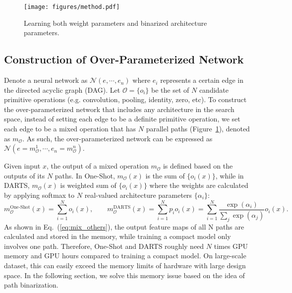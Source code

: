 \documentclass{article} \usepackage{iclr2019_conference,times}
\begin{document}
\begin{figure}[t]
    \vspace{-10pt}
	\centering
	\texttt{[image: figures/method.pdf]}
\caption{Learning both weight parameters and binarized architecture parameters.}
	\label{fig:method}
\end{figure}

\subsection{Construction of Over-Parameterized Network}\label{sec:over-parameterized}
Denote a neural network as $\mathcal{N}(e, \cdots, e_n)$ where $e_i$ represents a certain edge in the directed acyclic graph (DAG). Let $\mathcal{O} = \{o_i\}$ be the set of $N$ candidate primitive operations (e.g. convolution, pooling, identity, zero, etc). To construct the over-parameterized network that includes any architecture in the search space, instead of setting each edge to be a definite primitive operation, we set each edge to be a mixed operation that has $N$ parallel paths (Figure~\ref{fig:method}), denoted as $m_\mathcal{O}$. As such, the over-parameterized network can be expressed as $\mathcal{N}(e = m^{1}_\mathcal{O}, \cdots, e_n = m^{n}_\mathcal{O})$. 

Given input $x$, the output of a mixed operation $m_\mathcal{O}$ is defined based on the outputs of its $N$ paths. In One-Shot, $m_\mathcal{O}(x)$ is the sum of $\{o_i(x)\}$, while in DARTS, $m_\mathcal{O}(x)$ is weighted sum of $\{o_i(x)\}$ where the weights are calculated by applying softmax to $N$ real-valued architecture parameters $\{\alpha_i\}$:
\begin{equation}\label{eq:mix_others}
    m_\mathcal{O}^{\text{One-Shot}}(x) = \sum_{i=1}^N o_i(x), \qquad
    m_\mathcal{O}^{\text{DARTS}}(x) = \sum_{i=1}^N p_i o_i(x) = \sum_{i=1}^N \frac{\exp(\alpha_i)}{\sum_{j} \exp(\alpha_j)} o_i(x).
\end{equation}
As shown in Eq.~(\ref{eq:mix_others}), the output feature maps of all N paths are calculated and stored in the memory, while training a compact model only involves one path. Therefore, One-Shot and DARTS roughly need $N$ times GPU memory and GPU hours compared to training a compact model. On large-scale dataset, this can easily exceed the memory limits of hardware with large design space. In the following section, we solve this memory issue based on the idea of path binarization.
\end{document}
